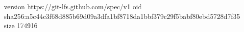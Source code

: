 version https://git-lfs.github.com/spec/v1
oid sha256:a5c44c3f68d885b69d09a3dfa1bf8718da1bbf379c29f5babf80ebd5728d7f35
size 174916

